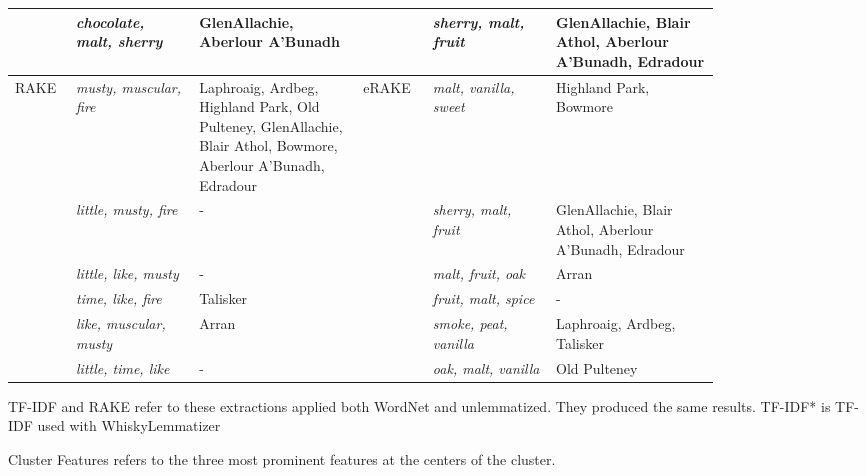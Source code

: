 \begin{threeparttable}
\begin{tabular}{p{0.05\linewidth} p{0.15\linewidth} p{0.2\linewidth}|p{0.07\linewidth} p{0.15\linewidth} p{0.2\linewidth}}
         & \textit{chocolate, malt, sherry} & GlenAllachie, Aberlour A'Bunadh                                                                                 &  & \textit{sherry, malt, fruit}  & GlenAllachie, Blair Athol, Aberlour A'Bunadh, Edradour  \\
    \midrule
    RAKE   & \textit{musty, muscular, fire}   & Laphroaig, Ardbeg, Highland Park, Old Pulteney, GlenAllachie, Blair Athol, Bowmore, Aberlour A'Bunadh, Edradour & eRAKE   & \textit{malt, vanilla, sweet} & Highland Park, Bowmore                                  \\
           & \textit{little, musty, fire}     & -                                                                                                               &    & \textit{sherry, malt, fruit}  & GlenAllachie, Blair Athol, Aberlour A'Bunadh, Edradour  \\
           & \textit{little, like, musty}     & -                                                                                                               &    & \textit{malt, fruit, oak}     & Arran                                                   \\
           & \textit{time, like, fire}        & Talisker                                                                                                        &    & \textit{fruit, malt, spice}   & -                                                       \\
           & \textit{like, muscular, musty}   & Arran                                                                                                           &    & \textit{smoke, peat, vanilla} & Laphroaig, Ardbeg, Talisker                             \\
           & \textit{little, time, like}      & -                                                                                                               &    & \textit{oak, malt, vanilla}   & Old Pulteney                                            \\
    \bottomrule
    \end{tabular}
    \begin{tablenotes}
        \small
        \item TF-IDF and RAKE refer to these extractions applied both WordNet and unlemmatized. They produced the same results. TF-IDF* is TF-IDF used with WhiskyLemmatizer
        \item Cluster Features refers to the three most prominent features at the centers of the cluster.
    \end{tablenotes}
\end{threeparttable}

